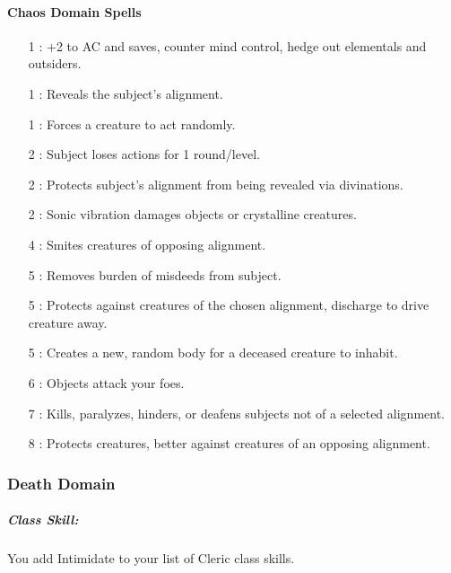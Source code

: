 \paragraph{Chaos Domain Spells}
\begin{itemize}
\item[1] : +2 to AC and saves, counter mind control, hedge out elementals and outsiders.
\item[1] : Reveals the subject's alignment.
\item[1] : Forces a creature to act randomly.
\item[2] : Subject loses actions for 1 round/level.
\item[2] : Protects subject's alignment from being revealed via divinations.
\item[2] : Sonic vibration damages objects or crystalline creatures.
\item[4] : Smites creatures of opposing alignment.
\item[5] : Removes burden of misdeeds from subject.
\item[5] : Protects against creatures of the chosen alignment, discharge to drive creature away.
\item[5] : Creates a new, random body for a deceased creature to inhabit.
\item[6] : Objects attack your foes.
\item[7] : Kills, paralyzes, hinders, or deafens subjects not of a selected alignment.
\item[8] : Protects creatures, better against creatures of an opposing alignment.
\end{itemize}
\subsubsection{Death Domain}
\label{Domain:Death}
\subparagraph{Class Skill:}
You add Intimidate to your list of Cleric class skills.
